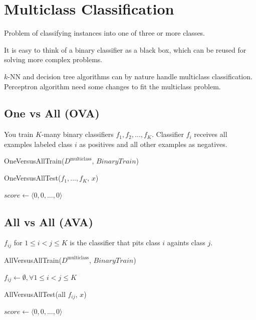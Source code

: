 \documentclass[a4paper,6pt,twocolumn,fleqn]{article}
\begin{document}
\section{Multiclass Classification}
Problem of classifying instances into one of three or more classes.

It is easy to think of a binary classifier as a black box, which can be reused for solving more complex problems.

\(k\)-NN and decision tree algorithms can by nature handle multiclass classification. Perceptron algorithm need some changes to fit the multiclass problem.

\subsection{One vs All (OVA)} %
You train \(K\)-many binary classifiers \(f_1, f_2, \ldots, f_K\). Classifier \(f_i\) receives all examples labeled class \(i\) as positives and all other examples as negatives.
\begin{algorithm}
\caption{OneVersusAllTrain($D^\text{multiclass}$, $BinaryTrain$)}
\label{alg:ovatrain}
\end{algorithm}
\begin{algorithm}
\caption{OneVersusAllTest($f_1,...,f_K$, $x$)}
\label{alg:ovatest}
$score \gets \langle 0,0,...,0 \rangle$\;
\end{algorithm}
\subsection{All vs All (AVA)} %
\(f_{ij}\) for \(1 \leq i < j \leq K\) is the classifier that pits class \(i\) againts class \(j\).
\begin{algorithm}
\caption{AllVersusAllTrain($D^\text{multiclass}$, $BinaryTrain$)}
\label{alg:avatrain}
$f_{ij} \gets \emptyset, \forall 1 \leq i < j \leq K$\;
\end{algorithm}
\begin{algorithm}
\caption{AllVersusAllTest(all $f_{ij}$, $x$)}
\label{alg:avatest}
$score \gets \langle 0, 0, ..., 0 \rangle$\;
\end{algorithm}
\end{document}
